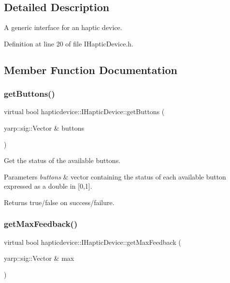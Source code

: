 \subsection{Detailed Description}
A generic interface for an haptic device. 

Definition at line 20 of file I\+Haptic\+Device.\+h.



\subsection{Member Function Documentation}
\label{classhapticdevice_1_1IHapticDevice_a83540a2fec263cb87628e9f521e89724} 
\subsubsection{\texorpdfstring{get\+Buttons()}{getButtons()}}
{\footnotesize\ttfamily virtual bool hapticdevice\+::\+I\+Haptic\+Device\+::get\+Buttons (\begin{DoxyParamCaption}\item[{yarp\+::sig\+::\+Vector \&}]{buttons }\end{DoxyParamCaption})\hspace{0.3cm}{\ttfamily [pure virtual]}}



Get the status of the available buttons. 


\begin{DoxyParams}{Parameters}
{\em buttons} & vector containing the status of each available button expressed as a double in \mbox{[}0,1\mbox{]}. \\
\hline
\end{DoxyParams}
\begin{DoxyReturn}{Returns}
true/false on success/failure. 
\end{DoxyReturn}
\label{classhapticdevice_1_1IHapticDevice_a976cc05cb22404a017f877837c82fc8e} 
\subsubsection{\texorpdfstring{get\+Max\+Feedback()}{getMaxFeedback()}}
{\footnotesize\ttfamily virtual bool hapticdevice\+::\+I\+Haptic\+Device\+::get\+Max\+Feedback (\begin{DoxyParamCaption}\item[{yarp\+::sig\+::\+Vector \&}]{max }\end{DoxyParamCaption})\hspace{0.3cm}{\ttfamily [pure virtual]}}



